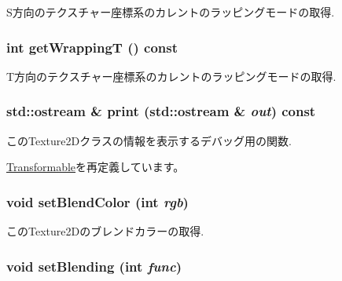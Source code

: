 S方向のテクスチャー座標系のカレントのラッピングモードの取得. \hypertarget{classm3g_1_1Texture2D_58375e5e8ddde63dcf74f882d053ae3f}{
\subsubsection[{getWrappingT}]{\setlength{\rightskip}{0pt plus 5cm}int getWrappingT () const}}
\label{classm3g_1_1Texture2D_58375e5e8ddde63dcf74f882d053ae3f}


T方向のテクスチャー座標系のカレントのラッピングモードの取得. \hypertarget{classm3g_1_1Texture2D_6fea17fa1532df3794f8cb39cb4f911f}{
\subsubsection[{print}]{\setlength{\rightskip}{0pt plus 5cm}std::ostream \& print (std::ostream \& {\em out}) const}}
\label{classm3g_1_1Texture2D_6fea17fa1532df3794f8cb39cb4f911f}


このTexture2Dクラスの情報を表示するデバッグ用の関数. 

\hyperlink{classm3g_1_1Transformable_6fea17fa1532df3794f8cb39cb4f911f}{Transformable}を再定義しています。\hypertarget{classm3g_1_1Texture2D_b5a6333203f443fb1f66ea2e39d4de1b}{
\subsubsection[{setBlendColor}]{\setlength{\rightskip}{0pt plus 5cm}void setBlendColor (int {\em rgb})}}
\label{classm3g_1_1Texture2D_b5a6333203f443fb1f66ea2e39d4de1b}


このTexture2Dのブレンドカラーの取得. \hypertarget{classm3g_1_1Texture2D_189d98ce3e8ac7590be771944b3186d4}{
\subsubsection[{setBlending}]{\setlength{\rightskip}{0pt plus 5cm}void setBlending (int {\em func})}}
\label{classm3g_1_1Texture2D_189d98ce3e8ac7590be771944b3186d4}


